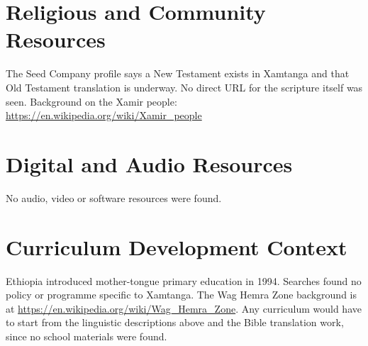 \documentclass[12pt]{article}
\begin{document}
\section{Religious and Community Resources}
The Seed Company profile says a New Testament exists in Xamtanga and that Old Testament translation is underway. No direct URL for the scripture itself was seen. Background on the Xamir people: \url{https://en.wikipedia.org/wiki/Xamir_people}

\section{Digital and Audio Resources}
No audio, video or software resources were found.

\section{Curriculum Development Context}
Ethiopia introduced mother-tongue primary education in 1994. Searches found no policy or programme specific to Xamtanga. The Wag Hemra Zone background is at \url{https://en.wikipedia.org/wiki/Wag_Hemra_Zone}. Any curriculum would have to start from the linguistic descriptions above and the Bible translation work, since no school materials were found.
\end{document}
